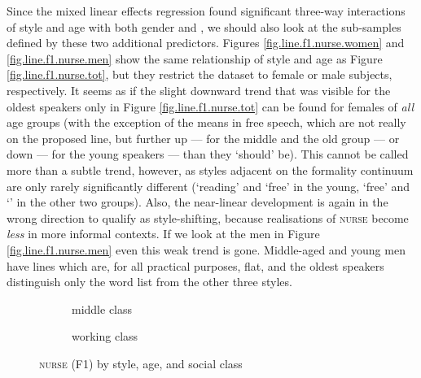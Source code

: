 Since the mixed linear effects regression found significant three-way interactions of style and age with both gender and , we should also look at the sub-samples defined by these two additional predictors.
Figures \ref{fig.line.f1.nurse.women} and \ref{fig.line.f1.nurse.men} show the same relationship of style and age as Figure \ref{fig.line.f1.nurse.tot}, but they restrict the dataset to female or male subjects, respectively.
It seems as if the slight downward trend that was visible for the oldest speakers only in Figure \ref{fig.line.f1.nurse.tot} can be found for females of \emph{all} age groups (with the exception of the means in free speech, which are not really on the proposed line, but further up --- for the middle and the old group --- or down --- for the young speakers --- than they `should' be).
This cannot be called more than a subtle trend, however, as styles adjacent on the formality continuum are only rarely significantly different (`reading' and `free' in the young, `free' and `' in the other two groups).
Also, the near-linear development is again in the wrong direction to qualify as style-shifting, because realisations of \textsc{nurse} become \emph{less}  in more informal contexts.
If we look at the men in Figure \ref{fig.line.f1.nurse.men} even this weak trend is gone.
Middle-aged and young men have lines which are, for all practical purposes, flat, and the oldest speakers distinguish only the word list from the other three styles.

\begin{figure}[h!]
	\centering
	\begin{subfigure}{.49\textwidth}
		\centering
			\resizebox{\linewidth}{!}{} 
		\caption{middle class}
		\label{fig.line.f1.nurse.mc}
	\end{subfigure}
	\begin{subfigure}{.49\textwidth}
		\centering
			\resizebox{\linewidth}{!}{} 
		\caption{working class}
		\label{fig.line.f1.nurse.wc}
	\end{subfigure}
	\caption{\textsc{nurse} (F1) by style, age, and social class}
\end{figure}

